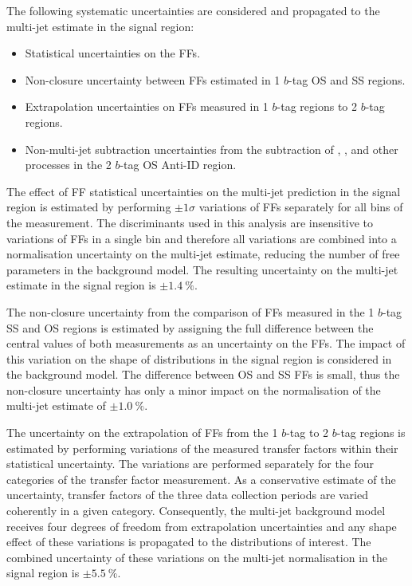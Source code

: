 The following systematic uncertainties are considered and propagated
to the multi-jet estimate in the \hadhad signal region:
\begin{itemize}

\item Statistical uncertainties on the FFs.

\item Non-closure uncertainty between FFs estimated in 1 $b$-tag OS and SS
  regions.

\item Extrapolation uncertainties on FFs measured in 1 $b$-tag regions to 2
  $b$-tag regions.

\item Non-multi-jet subtraction uncertainties from the subtraction of
  \ttbar, \ttbarFakes, and other processes in the 2 $b$-tag OS Anti-ID
  region.

\end{itemize}

The effect of FF statistical uncertainties on the multi-jet prediction in the
signal region is estimated by performing $\pm 1 \sigma$ variations of FFs
separately for all bins of the measurement. The discriminants used in this
analysis are insensitive to variations of FFs in a single bin and therefore all
variations are combined into a normalisation uncertainty on the multi-jet
estimate, reducing the number of free parameters in the background model. The
resulting uncertainty on the multi-jet estimate in the signal region is
$\pm \SI{1.4}{\percent}$.

The non-closure uncertainty from the comparison of FFs measured in the 1 $b$-tag
SS and OS regions is estimated by assigning the full difference between the
central values of both measurements as an uncertainty on the FFs. The impact of
this variation on the shape of distributions in the signal region is considered
in the background model. The difference between OS and SS FFs is small, thus the
non-closure uncertainty has only a minor impact on the normalisation of the
multi-jet estimate of $\pm \SI{1.0}{\percent}$.

The uncertainty on the extrapolation of FFs from the 1 $b$-tag to 2 $b$-tag
regions is estimated by performing variations of the measured transfer factors
within their statistical uncertainty. The variations are performed separately
for the four categories of the transfer factor measurement. As a conservative
estimate of the uncertainty, transfer factors of the three data collection
periods are varied coherently in a given category. Consequently, the multi-jet
background model receives four degrees of freedom from extrapolation
uncertainties and any shape effect of these variations is propagated to the
distributions of interest. The combined uncertainty of these variations on the
multi-jet normalisation in the signal region is $\pm \SI{5.5}{\percent}$.

